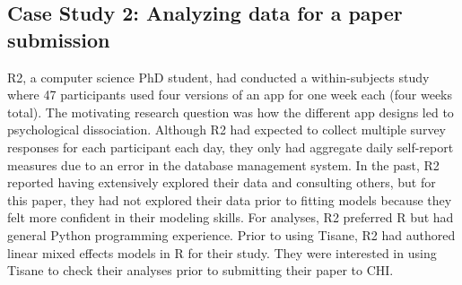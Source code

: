 \subsection{Case Study 2: Analyzing data for a paper submission}
R2, a computer science PhD student, had conducted a within-subjects study where
47 participants used four versions of an app for one week each (four
weeks total). The motivating research question was how the different app designs
led to %
psychological dissociation. %
Although R2 had expected to collect multiple survey responses for each
participant each day, they only had
aggregate daily self-report measures due to an error in the database management system.
In the past, R2 reported having extensively explored their data and
consulting others, but for this paper, they had not explored their data prior to
fitting models because they felt more confident in their modeling skills. For
analyses, R2 preferred R but had general Python programming experience. Prior
to using Tisane, R2 had authored linear mixed effects models in R for their
study. They were interested in using Tisane to check their analyses prior to
submitting their paper to CHI.


\def\numberofinstances{\texttt{number\_of\_instances}\xspace}


